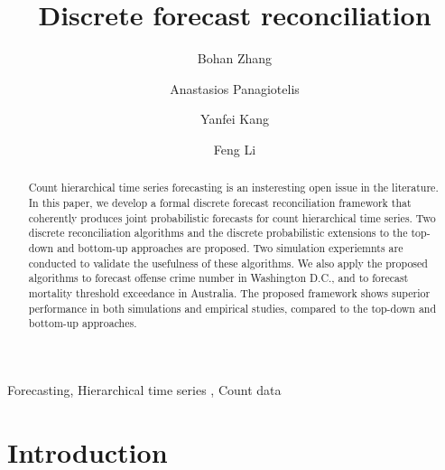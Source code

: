 \documentclass[a4paper,review,12pt,authoryear]{elsarticle}
\begin{document}
\begin{frontmatter}

  \title{Discrete forecast reconciliation}

  \author[label1]{Bohan Zhang}
  \address[label1]{School of Economics and Management, Beihang University, Beijing, China}
  \author[label2]{Anastasios Panagiotelis}
  \author[label1]{Yanfei Kang}
  
  \author[label3]{Feng Li}

  \address[label2]{The University of Sydney Business School, NSW 2006, Australia}
  \address[label3]{School of Statistics and Mathematics, Central University of Finance and Economics, Beijing, China}

  \begin{abstract}

    Count hierarchical time series forecasting is an insteresting open issue in the literature.
    In this paper, we develop a formal discrete forecast reconciliation framework that coherently produces joint probabilistic forecasts for count hierarchical time series.
    Two discrete reconciliation algorithms and the discrete probabilistic extensions to the top-down and bottom-up approaches are proposed.
    Two simulation experiemnts are conducted to validate the usefulness of these algorithms.
    We also apply the proposed algorithms to forecast offense crime number in Washington D.C., and to forecast mortality threshold exceedance in Australia.
    The proposed framework shows superior performance in both simulations and empirical studies, compared to the top-down and bottom-up approaches.
    
  \end{abstract}

  \begin{keyword}
  Forecasting\sep
  Hierarchical time series \sep
  Count data
  \end{keyword}
  
\end{frontmatter}

\newpage

\section{Introduction}
\end{document}
